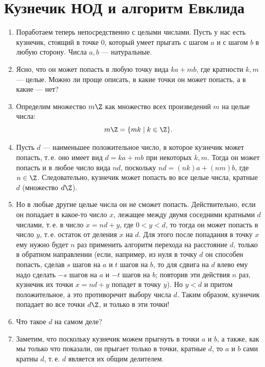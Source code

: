 \section{Кузнечик НОД и алгоритм Евклида}\label{EVKL}



\begin{enumerate}
\item Поработаем теперь непосредственно с целыми числами. Пусть у нас есть кузнечик, стоящий в точке 0, который умеет прыгать с шагом $a$ и с шагом $b$ в любую сторону. Числа $a,b$ --- натуральные.
\item Ясно, что он может попасть в любую точку вида $ka+mb$, где кратности $k,m$ --- целые. Можно ли проще описать, в какие точки он может попасть, а в какие --- нет?
\item Определим множество $m\Z$ как множество всех произведений $m$ на целые числа:
$$
m\Z = \{mk\mid k\in\Z\}.
$$
\item Пусть $d$ --- наименьшее положительное число, в которое кузнечик может попасть, т.\,е. оно имеет вид $d=ka+mb$ при некоторых $k,m$. Тогда он может попасть и в любое число вида $nd$, поскольку $nd=(nk)a+(nm)b$, где $n\in\Z$. Следовательно, кузнечик может попасть во все целые числа, кратные $d$ (множество $d\Z$).

\item Но в любые другие целые числа он не сможет попасть. Действительно, если он попадает в какое-то число $x$, лежащее между двумя соседними кратными $d$ числами, т.\,е. в число $x=nd+y$, где $0<y<d$, то тогда он может попасть в число $y$, т.\,е. остаток от деления $x$ на $d$. Для этого после попадания в точку $x$ ему нужно будет $n$ раз применить алгоритм перехода на расстояние $d$, только в обратном направлении (если, например, из нуля в точку $d$ он способен попасть, сделав $s$ шагов на $a$ и $t$ шагов на $b$, то для сдвига на $d$ влево ему надо сделать $-s$ шагов на $a$ и $-t$ шагов на $b$; повторив эти действия $n$ раз, кузнечик их точки $x=nd+y$ попадет в точку $y$).  Но $y<d$ и притом положительное, а это противоречит выбору числа $d$. Таким образом, кузнечик попадает во все точки $d\Z$, и только в эти точки!

\item Что такое $d$ на самом деле?

\item Заметим, что поскольку кузнечик можем прыгнуть в точки $a$ и $b$, а также, как мы только что показали, он прыгает только в точки, кратные $d$, то $a$ и $b$ сами кратны $d$, т.\,е. $d$ является их общим делителем.


\end{enumerate}
